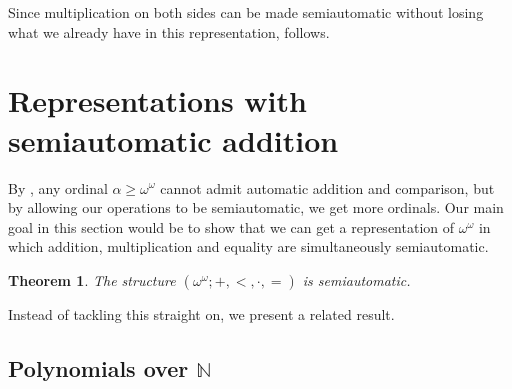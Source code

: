 \documentclass[british,a4paper,11pt,abstract=on]{scrreprt}
\newtheorem{theorem}{Theorem}
\theoremstyle{definition}
\theoremstyle{remark}
\begin{document}
Since multiplication on both sides can be made semiautomatic without losing what we already have in this representation,
 follows.

\section{Representations with semiautomatic addition}

By , any ordinal \(\alpha \geq \omega^\omega\) cannot admit automatic addition and comparison,
but by allowing our operations to be semiautomatic, we get more ordinals.
Our main goal in this section would be to show that we can get a representation of \(\omega^\omega\) in which addition, multiplication and equality are simultaneously semiautomatic.
\begin{theorem} \label{omega polynomials}
    The structure \((\omega^\omega; +, <, \cdot, =)\) is semiautomatic.
\end{theorem}

Instead of tackling this straight on, we present a related result.

\subsection{Polynomials over \(\mathbb{N}\)}
\end{document}
